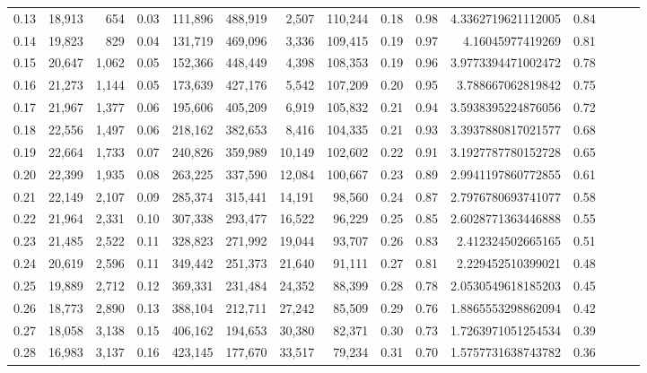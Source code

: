 \begin{tabular}{rrrrrrrrrrrrrrr}
0.13 &  18,913 &    654 &  0.03 &  111,896 &  488,919 &    2,507 &  110,244 &  0.18 &  0.98 &      4.3362719621112005 &      0.84 \\
0.14 &  19,823 &    829 &  0.04 &  131,719 &  469,096 &    3,336 &  109,415 &  0.19 &  0.97 &        4.16045977419269 &      0.81 \\
0.15 &  20,647 &  1,062 &  0.05 &  152,366 &  448,449 &    4,398 &  108,353 &  0.19 &  0.96 &      3.9773394471002472 &      0.78 \\
0.16 &  21,273 &  1,144 &  0.05 &  173,639 &  427,176 &    5,542 &  107,209 &  0.20 &  0.95 &       3.788667062819842 &      0.75 \\
0.17 &  21,967 &  1,377 &  0.06 &  195,606 &  405,209 &    6,919 &  105,832 &  0.21 &  0.94 &      3.5938395224876056 &      0.72 \\
0.18 &  22,556 &  1,497 &  0.06 &  218,162 &  382,653 &    8,416 &  104,335 &  0.21 &  0.93 &      3.3937880817021577 &      0.68 \\
0.19 &  22,664 &  1,733 &  0.07 &  240,826 &  359,989 &   10,149 &  102,602 &  0.22 &  0.91 &      3.1927787780152728 &      0.65 \\
0.20 &  22,399 &  1,935 &  0.08 &  263,225 &  337,590 &   12,084 &  100,667 &  0.23 &  0.89 &      2.9941197860772855 &      0.61 \\
0.21 &  22,149 &  2,107 &  0.09 &  285,374 &  315,441 &   14,191 &   98,560 &  0.24 &  0.87 &      2.7976780693741077 &      0.58 \\
0.22 &  21,964 &  2,331 &  0.10 &  307,338 &  293,477 &   16,522 &   96,229 &  0.25 &  0.85 &      2.6028771363446888 &      0.55 \\
0.23 &  21,485 &  2,522 &  0.11 &  328,823 &  271,992 &   19,044 &   93,707 &  0.26 &  0.83 &       2.412324502665165 &      0.51 \\
0.24 &  20,619 &  2,596 &  0.11 &  349,442 &  251,373 &   21,640 &   91,111 &  0.27 &  0.81 &       2.229452510399021 &      0.48 \\
0.25 &  19,889 &  2,712 &  0.12 &  369,331 &  231,484 &   24,352 &   88,399 &  0.28 &  0.78 &      2.0530549618185203 &      0.45 \\
0.26 &  18,773 &  2,890 &  0.13 &  388,104 &  212,711 &   27,242 &   85,509 &  0.29 &  0.76 &      1.8865553298862094 &      0.42 \\
0.27 &  18,058 &  3,138 &  0.15 &  406,162 &  194,653 &   30,380 &   82,371 &  0.30 &  0.73 &      1.7263971051254534 &      0.39 \\
0.28 &  16,983 &  3,137 &  0.16 &  423,145 &  177,670 &   33,517 &   79,234 &  0.31 &  0.70 &      1.5757731638743782 &      0.36 \\

\end{tabular}
